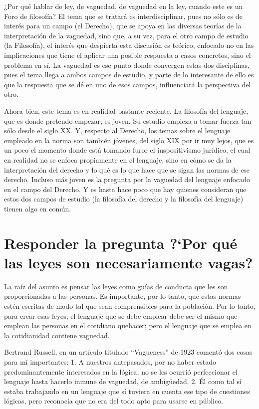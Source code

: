 \documentclass[]{book}
\begin{document}
\begin{refsection}
¿Por qué hablar de ley, de vaguedad, de vaguedad en la ley, cuando este
es un Foro de filosofía? El tema que se tratará es interdisciplinar,
pues no sólo es de interés para un campo (el Derecho), que se apoya en
las diversas teorías de la interpretación de la vaguedad, sino que, a su
vez, para el otro campo de estudio (la Filosofía), el interés que
despierta esta discusión es teórico, enfocado no en las implicaciones
que tiene el aplicar una posible respuesta a casos concretos, sino el
problema en sí. La vaguedad es ese punto donde convergen estas dos
disciplinas, pues el tema llega a ambos campos de estudio, y parte de lo
interesante de ello es que la respuesta que se dé en uno de esos campos,
influenciará la perspectiva del otro.

Ahora bien, este tema es en realidad bastante reciente. La filosofía del
lenguaje, que es donde pretendo empezar, es joven. Su estudio empieza a
tomar fuerza tan sólo desde el siglo XX. Y, respecto al Derecho, los
temas sobre el lenguaje empleado en la norma son también jóvenes, del
siglo XIX por ir muy lejos, que es un poco el momento donde está tomando
furor el iuspositivismo jurídico, el cual en realidad no se enfoca
propiamente en el lenguaje, sino en cómo se da la interpretación del
derecho y lo qué es lo que hace que se sigan las normas de ese derecho.
Incluso más joven es la pregunta por la vaguedad del lenguaje enfocado
en el campo del Derecho. Y es hasta hace poco que hay quienes consideran
que estos dos campos de estudio (la filosofía del derecho y la filosofía
del lenguaje) tienen algo en común.

\section*{Responder la pregunta ?`Por qué las leyes son necesariamente vagas?}

La raíz del asunto es pensar las leyes como guías de conducta que les
son proporcionadas a las personas. Es importante, por lo tanto, que
estas normas estén escritas de modo tal que sean comprensibles para la
población. Por lo tanto, para crear esas leyes, el lenguaje que se debe
emplear debe ser el mismo que emplean las personas en el cotidiano
quehacer; pero el lenguaje que se emplea en la cotidianidad contiene
vaguedad.

Bertrand Russell, en un artículo titulado ``Vagueness'' de 1923 comentó
dos cosas para mí importantes: 1. A nuestros antepasados, por no haber
estado predominantemente interesados en la lógica, no se les ocurrió
perfeccionar el lenguaje hasta hacerlo inmune de vaguedad, de
ambigüedad. 2. Él como tal sí estaba trabajando en un lenguaje que sí
tuviera en cuenta ese tipo de cuestiones lógicas, pero reconocía que no
era del todo apto para usarse en público.


\end{refsection}
\end{document}
